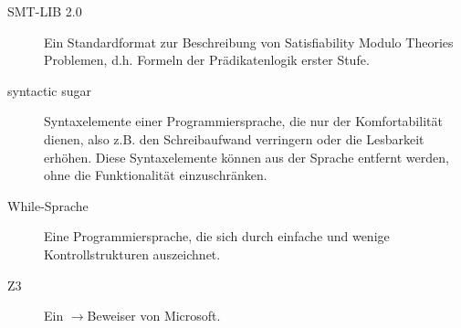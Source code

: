 \documentclass[a4paper,10pt]{article}
\begin{document}
\begin{description}
\item[SMT-LIB 2.0] Ein Standardformat zur Beschreibung von Satisfiability Modulo Theories Problemen, d.h. Formeln der Pr\"{a}dikatenlogik erster Stufe.
\item[syntactic sugar] Syntaxelemente einer Programmiersprache, die nur der Komfortabilit\"{a}t dienen, also z.B. den Schreibaufwand verringern oder die Lesbarkeit erhöhen. Diese Syntaxelemente k\"{o}nnen aus der Sprache entfernt werden, ohne die Funktionalit\"{a}t einzuschr\"{a}nken.
\item[While-Sprache] Eine Programmiersprache, die sich durch einfache und wenige Kontrollstrukturen auszeichnet.
\item[Z3] Ein $\to$Beweiser von Microsoft.
\end{description}
\end{document}
